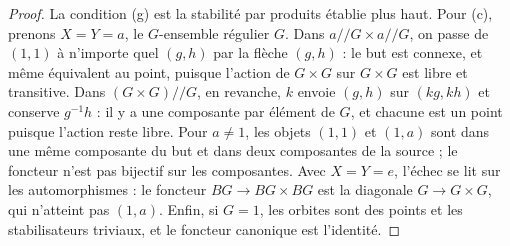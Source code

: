 \begin{proof}
La condition (g) est la stabilité par produits établie plus haut. Pour (c), prenons $X = Y = a$, le $G$-ensemble régulier $G$. Dans $a/\!/G \times a/\!/G$, on passe de $(1, 1)$ à n'importe quel $(g, h)$ par la flèche $(g, h)$ : le but est connexe, et même équivalent au point, puisque l'action de $G \times G$ sur $G \times G$ est libre et transitive. Dans $(G \times G)/\!/G$, en revanche, $k$ envoie $(g, h)$ sur $(kg, kh)$ et conserve $g^{-1}h$ : il y a une composante par élément de $G$, et chacune est un point puisque l'action reste libre. Pour $a \neq 1$, les objets $(1, 1)$ et $(1, a)$ sont dans une même composante du but et dans deux composantes de la source ; le foncteur n'est pas bijectif sur les composantes. Avec $X = Y = e$, l'échec se lit sur les automorphismes : le foncteur $BG \to BG \times BG$ est la diagonale $G \to G \times G$, qui n'atteint pas $(1, a)$. Enfin, si $G = 1$, les orbites sont des points et les stabilisateurs triviaux, et le foncteur canonique est l'identité.
\end{proof}

